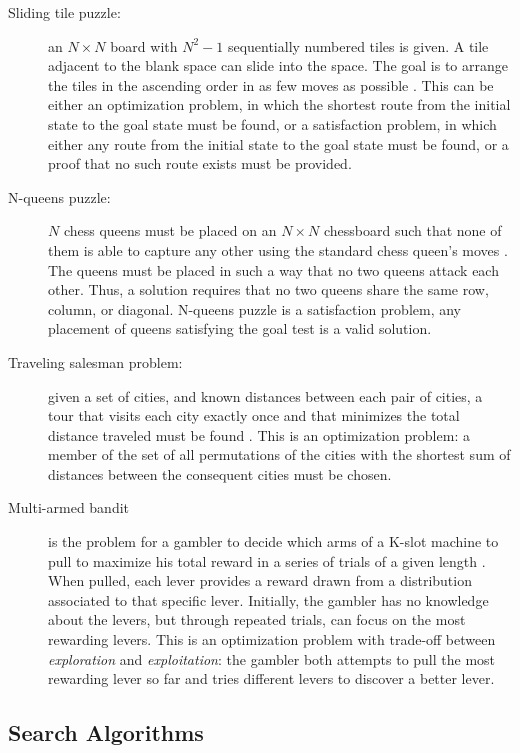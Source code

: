 \begin{description}
\item[Sliding tile puzzle:] an $N\times N$ board with $N^2-1$
  sequentially numbered tiles is given. A tile adjacent to the blank
  space can slide into the space. The goal is to arrange the tiles in
  the ascending order in as few moves as
  possible \cite{Russell.aima}. This can be either an optimization
  problem, in which the shortest route from the initial state to the
  goal state must be found, or a satisfaction problem, in which either
  any route from the initial state to the goal state must be found, or a
  proof that no such route exists must be provided.

\item[N-queens puzzle:] $N$ chess queens must be placed
  on an $N\times N$ chessboard such that none of them is able to
  capture any other using the standard chess queen's
  moves \cite{Russell.aima}. The queens must be placed in such a way
  that no two queens attack each other. Thus, a solution requires that
  no two queens share the same row, column, or diagonal. N-queens
  puzzle is a satisfaction problem, any placement of queens satisfying
  the goal test is a valid solution.

\item[Traveling salesman problem:] given a set of cities, and known
 distances between each pair of cities, a tour that visits each city
 exactly once and that minimizes the total distance traveled must be
 found \cite{Russell.aima}. This is an optimization problem: a member
 of the set of all permutations of the cities with the shortest sum of
 distances between the consequent cities must be chosen.

\item[Multi-armed bandit] is the problem for a gambler
 to decide which arms of a K-slot machine to pull to maximize his
 total reward in a series of trials of a given
 length \cite{Vermorel.bandits}. When pulled, each lever provides a
 reward drawn from a distribution associated to that specific
 lever. Initially, the gambler has no knowledge about the levers, but
 through repeated trials, can focus on the most rewarding levers. This
 is an optimization problem with trade-off between {\em exploration}
 and {\em exploitation}: the gambler both attempts to pull the most
 rewarding lever so far and tries different levers to discover a
 better lever.
\end{description}

\subsection{Search Algorithms}

